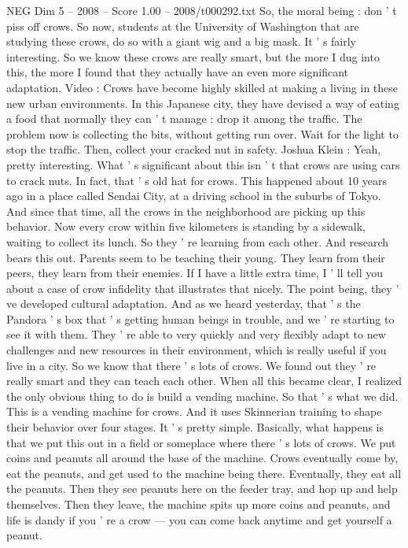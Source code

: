 \begin{textsample}{NEG Dim 5 – 2008 – Score 1.00 – 2008/t000292.txt}
So, the moral being : don ' t piss off crows.
So now, students at the University of Washington that are studying these crows, do so with a giant wig and a big mask.
It ' s fairly interesting.
So we know these crows are really smart, but the more I dug into this, the more I found that they actually have an even more significant adaptation.
Video : Crows have become highly skilled at making a living in these new urban environments.
In this Japanese city, they have devised a way of eating a food that normally they can ' t manage : drop it among the traffic.
The problem now is collecting the bits, without getting run over.
Wait for the light to stop the traffic.
Then, collect your cracked nut in safety.
Joshua Klein : Yeah, pretty interesting.
What ' s significant about this isn ' t that crows are using cars to crack nuts.
In fact, that ' s old hat for crows.
This happened about 10 years ago in a place called Sendai City, at a driving school in the suburbs of Tokyo.
And since that time, all the crows in the neighborhood are picking up this behavior.
Now every crow within five kilometers is standing by a sidewalk, waiting to collect its lunch.
So they ' re learning from each other.
And research bears this out.
Parents seem to be teaching their young.
They learn from their peers, they learn from their enemies.
If I have a little extra time, I ' ll tell you about a case of crow infidelity that illustrates that nicely.
The point being, they ' ve developed cultural adaptation.
And as we heard yesterday, that ' s the Pandora ' s box that ' s getting human beings in trouble, and we ' re starting to see it with them.
They ' re able to very quickly and very flexibly adapt to new challenges and new resources in their environment, which is really useful if you live in a city.
So we know that there ' s lots of crows.
We found out they ' re really smart and they can teach each other.
When all this became clear, I realized the only obvious thing to do is build a vending machine.
So that ' s what we did.
This is a vending machine for crows.
And it uses Skinnerian training to shape their behavior over four stages.
It ' s pretty simple.
Basically, what happens is that we put this out in a field or someplace where there ' s lots of crows.
We put coins and peanuts all around the base of the machine.
Crows eventually come by, eat the peanuts, and get used to the machine being there.
Eventually, they eat all the peanuts.
Then they see peanuts here on the feeder tray, and hop up and help themselves.
Then they leave, the machine spits up more coins and peanuts, and life is dandy if you ' re a crow — you can come back anytime and get yourself a peanut.

\end{textsample}
